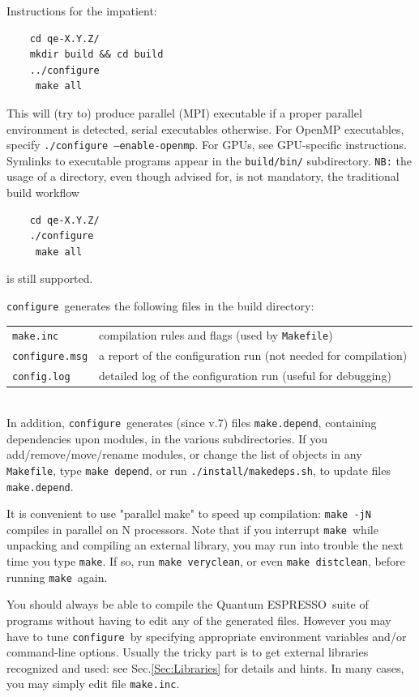 \documentclass[12pt,a4paper]{article}
\def\qe{{\sc Quantum ESPRESSO}}
\def\configure{\texttt{configure}}
\def\make{\texttt{make}}
\begin{document}
Instructions for the impatient:
\begin{verbatim}
    cd qe-X.Y.Z/
    mkdir build && cd build
    ../configure
     make all
\end{verbatim}
This will (try to) produce parallel (MPI) executable if a proper parallel
environment is detected, serial executables otherwise. For OpenMP executables,
specify \texttt{./configure --enable-openmp}. For  GPUs, see GPU-specific
instructions. Symlinks to executable programs appear in the \texttt{build/bin/} 
subdirectory.
\texttt{NB:} the usage of a  directory, even though advised for, 
is not mandatory, the traditional build workflow
\begin{verbatim}
    cd qe-X.Y.Z/
    ./configure
     make all
\end{verbatim}
is still supported.

\noindent \configure\ generates the following files in the build directory:

\begin{tabular}{ll}
\texttt{make.inc} &      compilation rules and flags (used by \texttt{Makefile})\\
\texttt{configure.msg} & a report of the configuration run (not needed for compilation)\\
\texttt{config.log} & detailed log of the configuration run (useful for debugging)\\
\end{tabular}\\
In addition, \configure\ generates (since v.7) files \texttt{make.depend},
containing dependencies upon modules, in the various subdirectories.
If you add/remove/move/rename modules, or change the list of objects
in any \texttt{Makefile}, type \texttt{make depend}, or run 
\texttt{./install/makedeps.sh}, to update files \texttt{make.depend}.

It is convenient to use "parallel make" to speed up compilation:
\texttt{make -jN} compiles in parallel on N processors. Note that
if you interrupt \make\ while unpacking and compiling an external 
library, you may run into trouble the next time you type \make. 
If so, run \texttt{make veryclean}, or even \texttt{make distclean}, 
before running \make\ again.

You should always be able to compile the \qe\ suite
of programs without having to edit any of the generated files. However you
may have to tune \configure\ by specifying appropriate environment variables
and/or command-line options. Usually the tricky part is to get external
libraries recognized and used: see Sec.\ref{Sec:Libraries}
for details and hints. In many cases, you may simply edit file
\texttt{make.inc}. 
\end{document}
